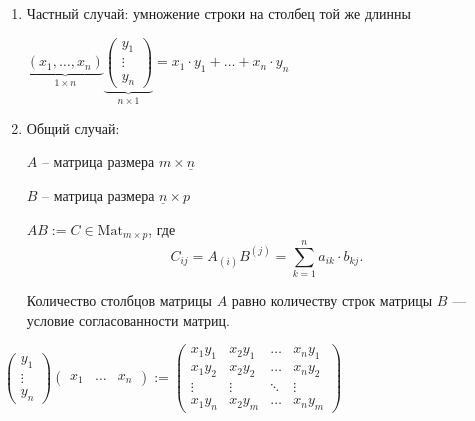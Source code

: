 \begin{enumerate}[label=\arabic*)]
    \item
        Частный случай: умножение строки на столбец той же длинны

        $\underbrace{(x_1, \dots, x_n)}_{1 \times n}
        \underbrace{\begin{pmatrix}
            y_1 \\ \vdots \\ y_n
        \end{pmatrix}}_{n \times 1}
        = x_1 \cdot y_1 + \dots + x_n \cdot y_n$

    \item
        Общий случай:

        $A$ -- матрица размера $m \times \underline{n}$

        $B$ -- матрица размера $\underline{n} \times p$

        $AB := C \in \text{Mat}_{m \times p}$, где
        \begin{equation*}
            C_{ij} = A_{(i)} B^{(j)} = \sum_{k = 1}^{n} a_{ik} \cdot b_{kj}
        .\end{equation*}

        Количество столбцов матрицы $A$ равно количеству строк матрицы $B$ --- условие согласованности матриц.
\end{enumerate}

\begin{example}
    \( \begin{pmatrix}
        y_1 \\ \vdots \\ y_n
    \end{pmatrix} 
    \begin{pmatrix}
        x_1 & \dots & x_n
    \end{pmatrix}
    := 
    \begin{pmatrix}
        x_1 y_1 & x_2 y_1 & \dots & x_n y_1 \\
        x_1 y_2 & x_2 y_2 & \dots & x_n y_2 \\
        \vdots & \vdots & \ddots & \vdots \\
        x_1 y_n & x_2 y_m & \dots & x_n y_m 
    \end{pmatrix} \)
\end{example}

